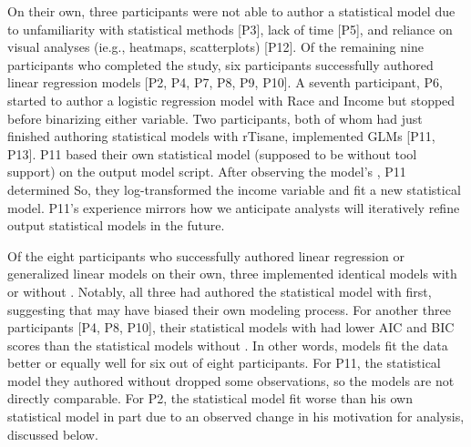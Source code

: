 On their own, three participants were not able to author a statistical model due
to unfamiliarity with statistical methods [P3], lack of time [P5], and reliance
on visual analyses (ie.g., heatmaps, scatterplots) [P12]. Of the remaining nine
participants who completed the study, six participants successfully authored
linear regression models [P2, P4, P7, P8, P9, P10]. A seventh participant, P6,
started to author a logistic regression model with Race and Income but stopped
before binarizing either variable. Two participants, both of whom had just
finished authoring statistical models with rTisane, implemented GLMs [P11, P13].
P11 based their own statistical model (supposed to be without tool support) on the \rTisane output model script. 
After observing the model's , P11 determined  So, they log-transformed the income variable and fit a new statistical model. 
P11’s experience mirrors how we anticipate analysts will iteratively refine
\rTisane output statistical models in the future.

Of the eight participants who successfully authored linear regression or
generalized linear models on their own, three implemented identical models with
or without \rTisane [P7, P9, P13]. Notably, all three had authored the
statistical model with \rTisane first, suggesting that \rTisane may have biased
their own modeling process. For another three participants [P4, P8, P10], their
statistical models with \rTisane had lower AIC and BIC scores than the
statistical models without \rTisane. In other words, \rTisane models fit the data
better or equally well for six out of eight participants. For P11, the
statistical model they authored without \rTisane dropped some observations, so
the models are not directly comparable. For P2, the \rTisane statistical model fit
worse than his own statistical model in part due to an observed change in his
motivation for analysis, discussed below. 

